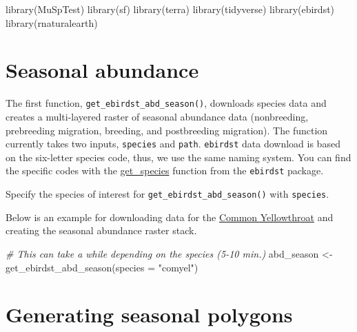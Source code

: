 \documentclass[
]{book}
\newenvironment{Shaded}{\begin{snugshade}}{\end{snugshade}}
\newcommand{\AttributeTok}[1]{\textcolor[rgb]{0.77,0.63,0.00}{#1}}
\newcommand{\CommentTok}[1]{\textcolor[rgb]{0.56,0.35,0.01}{\textit{#1}}}
\newcommand{\FunctionTok}[1]{\textcolor[rgb]{0.00,0.00,0.00}{#1}}
\newcommand{\NormalTok}[1]{#1}
\newcommand{\OtherTok}[1]{\textcolor[rgb]{0.56,0.35,0.01}{#1}}
\newcommand{\StringTok}[1]{\textcolor[rgb]{0.31,0.60,0.02}{#1}}
\begin{document}
\begin{Shaded}
\begin{Highlighting}[]
\FunctionTok{library}\NormalTok{(MuSpTest)}
\FunctionTok{library}\NormalTok{(sf)}
\FunctionTok{library}\NormalTok{(terra)}
\FunctionTok{library}\NormalTok{(tidyverse)}
\FunctionTok{library}\NormalTok{(ebirdst)}
\FunctionTok{library}\NormalTok{(rnaturalearth)}
\end{Highlighting}
\end{Shaded}

\hypertarget{seasonal-abundance}{%
\section{Seasonal abundance}\label{seasonal-abundance}}

The first function, \texttt{get\_ebirdst\_abd\_season()}, downloads species data and creates a multi-layered raster of seasonal abundance data (nonbreeding, prebreeding migration, breeding, and postbreeding migration). The function currently takes two inputs, \texttt{species} and \texttt{path}. \texttt{ebirdst} data download is based on the six-letter species code, thus, we use the same naming system. You can find the specific codes with the \href{https://rdrr.io/github/CornellLabofOrnithology/ebirdst/man/get_species.html}{get\_species} function from the \texttt{ebirdst} package.

Specify the species of interest for \texttt{get\_ebirdst\_abd\_season()} with \texttt{species}.

Below is an example for downloading data for the \href{https://ebird.org/species/comyel}{Common Yellowthroat} and creating the seasonal abundance raster stack.

\begin{Shaded}
\begin{Highlighting}[]
\CommentTok{\# This can take a while depending on the species (5{-}10 min.)}
\NormalTok{abd\_season }\OtherTok{\textless{}{-}} \FunctionTok{get\_ebirdst\_abd\_season}\NormalTok{(}\AttributeTok{species =} \StringTok{"comyel"}\NormalTok{)}
\end{Highlighting}
\end{Shaded}

\hypertarget{generating-seasonal-polygons}{%
\section{Generating seasonal polygons}\label{generating-seasonal-polygons}}
\end{document}
